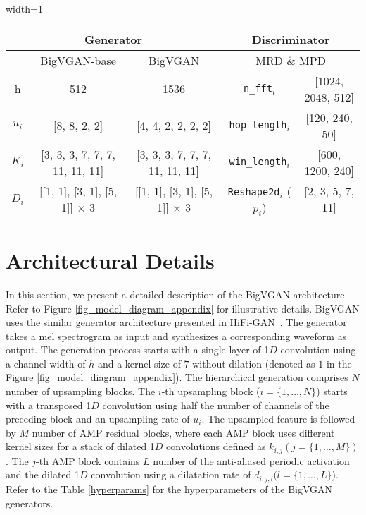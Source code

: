 \documentclass{article} \usepackage{iclr2023_conference,times}
\theoremstyle{plain}
\theoremstyle{definition}
\theoremstyle{remark}
\begin{document}
\begin{table*}[h]
\caption{\footnotesize
Hyperparameters of BigVGAN generators and discriminators.}
\label{hyperparams}
\vspace{-.3cm}
\begin{center}
\begin{small}
\begin{adjustbox}{width=1\textwidth}
\begin{tabular}{c|cc|c|c}
\toprule
\multicolumn{3}{c}{Generator} & \multicolumn{2}{c}{Discriminator}\\
\midrule
  & BigVGAN-base & BigVGAN & \multicolumn{2}{c}{MRD \& MPD} \\
\midrule
h  & 512  & 1536 & \texttt{n\_fft}$_i$ & [1024, 2048, 512] \\
$u_i$ & [8, 8, 2, 2]  & [4, 4, 2, 2, 2, 2] & \texttt{hop\_length}$_i$ & [120, 240, 50] \\
$K_i$  & [3, 3, 3, 7, 7, 7, 11, 11, 11] & [3, 3, 3, 7, 7, 7, 11, 11, 11] & \texttt{win\_length}$_i$ & [600, 1200, 240]  \\
$D_{i}$ & [[1, 1], [3, 1], [5, 1]] $\times$ 3 & [[1, 1], [3, 1], [5, 1]] $\times$ 3 & \texttt{Reshape2d}$_i$ ($p_i$) & [2, 3, 5, 7, 11] \\
\bottomrule
\end{tabular}
\end{adjustbox}
\end{small}
\end{center}
\vskip -0.1in
\end{table*}


\section{Architectural Details}
\label{appendix:arch_detail}
In this section, we present a detailed description of the BigVGAN architecture. Refer to Figure \ref{fig_model_diagram_appendix} for illustrative details. BigVGAN uses the similar generator architecture presented in HiFi-GAN~\citep{kong2020hifi}. The generator takes a mel spectrogram as input and synthesizes a corresponding waveform as output. The generation process starts with a single layer of 1$D$ convolution using a channel width of $h$ and a kernel size of $7$ without dilation (denoted as $1$ in the Figure \ref{fig_model_diagram_appendix}). The hierarchical generation comprises $N$ number of upsampling blocks. The $i$-th upsampling block ($i=\{1, \ldots, N\}$) starts with a transposed 1$D$ convolution using half the number of channels of the preceding block and an upsampling rate of $u_i$. The upsampled feature is followed by $M$ number of AMP residual blocks, where each AMP block uses different kernel sizes for a stack of dilated 1$D$ convolutions defined as ${k}_{i,j} (j=\{1, \ldots, M\})$. The $j$-th AMP block contains $L$ number of the anti-aliased periodic activation and the dilated 1$D$ convolution using a dilatation rate of $d_{i,j,l} (l=\{1, \ldots , L\}$). Refer to the Table \ref{hyperparams} for the hyperparameters of the BigVGAN generators.
\end{document}
